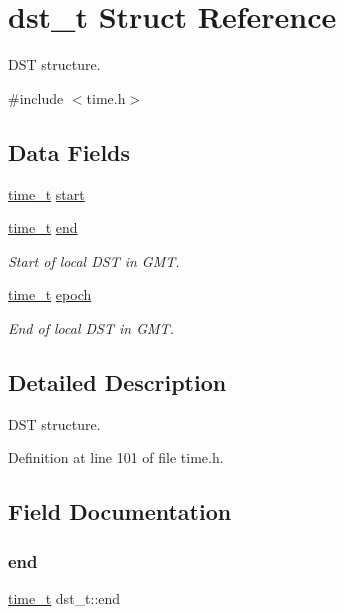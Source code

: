 \hypertarget{structdst__t}{}\section{dst\+\_\+t Struct Reference}
\label{structdst__t}


D\+ST structure.  




{\ttfamily \#include $<$time.\+h$>$}

\subsection*{Data Fields}
\begin{DoxyCompactItemize}
\item 
\hyperlink{time_8h_a3346b04b0420b32ccf6b706551b70762}{time\+\_\+t} \hyperlink{structdst__t_af1868fb321db3637664e3a3bf11cf56b}{start}
\item 
\hyperlink{time_8h_a3346b04b0420b32ccf6b706551b70762}{time\+\_\+t} \hyperlink{structdst__t_a9a6e1d16a7057ad1206b9230b073f99f}{end}
\begin{DoxyCompactList}\small\item\em Start of local D\+ST in G\+MT. \end{DoxyCompactList}\item 
\hyperlink{time_8h_a3346b04b0420b32ccf6b706551b70762}{time\+\_\+t} \hyperlink{structdst__t_ae8b931e1a2731b688e1af1253787827c}{epoch}
\begin{DoxyCompactList}\small\item\em End of local D\+ST in G\+MT. \end{DoxyCompactList}\end{DoxyCompactItemize}


\subsection{Detailed Description}
D\+ST structure. 

Definition at line 101 of file time.\+h.



\subsection{Field Documentation}
\mbox{\label{structdst__t_a9a6e1d16a7057ad1206b9230b073f99f}} 
\subsubsection{\texorpdfstring{end}{end}}
{\footnotesize\ttfamily \hyperlink{time_8h_a3346b04b0420b32ccf6b706551b70762}{time\+\_\+t} dst\+\_\+t\+::end}



